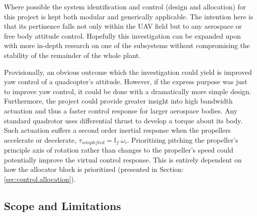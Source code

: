 \par
Where possible the system identification and control (design and allocation) for this project is kept both modular and generically applicable. The intention here is that its pertinence falls not only within the UAV field but to any aerospace or free body attitude control. Hopefully this investigation can be expanded upon with more in-depth research on one of the subsystems without compromising the stability of the remainder of the whole plant.
\par
Provisionally, an obvious outcome which the investigation could yield is improved yaw control of a quadcopter's attitude. However, if the express purpose was just to improve yaw control, it could be done with a dramatically more simple design. Furthermore, the project could provide greater insight into high bandwidth actuation and thus a faster control response for larger aerospace bodies. Any standard quadrotor uses differential thrust to develop a torque about its body. Such actuation suffers a second order inertial response when the propellers accelerate or decelerate, $\tau_{simplified}=\mathbb{I}_f~\dot{\omega}_{i}$. Prioritizing pitching the propeller's principle axis of rotation rather than changes to the propeller's speed could potentially improve the virtual control response. This is entirely dependent on how the allocator block is prioritized (presented in Section:\ref{sec:control.allocation}).
\subsection{Scope and Limitations}
\label{subsec:intro.foreword.scopeandlim}
